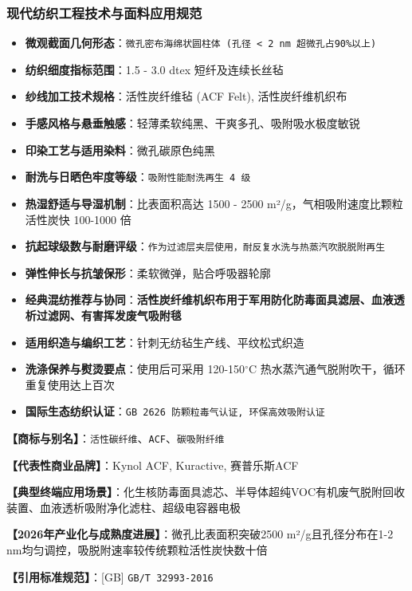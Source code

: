 \documentclass[11pt,openright,twoside,UTF8]{ctexbook}
\begin{document}
\subsubsection*{现代纺织工程技术与面料应用规范}
\begin{itemize} \setlength{\itemsep}{2pt}
    \item \textbf{微观截面几何形态}：\texttt{微孔密布海绵状圆柱体 (孔径 \textless{} 2 nm 超微孔占90\%以上)}
    \item \textbf{纺织细度指标范围}：1.5 - 3.0 dtex 短纤及连续长丝毡
    \item \textbf{纱线加工技术规格}：活性炭纤维毡 (ACF Felt), 活性炭纤维机织布
    \item \textbf{手感风格与悬垂触感}：轻薄柔软纯黑、干爽多孔、吸附吸水极度敏锐
    \item \textbf{印染工艺与适用染料}：微孔碳原色纯黑
    \item \textbf{耐洗与日晒色牢度等级}：\texttt{吸附性能耐洗再生 4 级}
    \item \textbf{热湿舒适与导湿机制}：比表面积高达 1500 - 2500 m²/g，气相吸附速度比颗粒活性炭快 100-1000 倍
    \item \textbf{抗起球级数与耐磨评级}：\texttt{作为过滤层夹层使用，耐反复水洗与热蒸汽吹脱脱附再生}
    \item \textbf{弹性伸长与抗皱保形}：柔软微弹，贴合呼吸器轮廓
    \item \textbf{经典混纺推荐与协同}：\textbf{活性炭纤维机织布用于军用防化防毒面具滤层、血液透析过滤网、有害挥发废气吸附毯}
    \item \textbf{适用织造与编织工艺}：针刺无纺毡生产线、平纹松式织造
    \item \textbf{洗涤保养与熨烫要点}：使用后可采用 120-150$^\circ\mathrm{C}$ 热水蒸汽通气脱附吹干，循环重复使用达上百次
    \item \textbf{国际生态纺织认证}：\texttt{GB 2626 防颗粒毒气认证, 环保高效吸附认证}
\end{itemize}
\vspace{0.2cm}

\noindent\textbf{【商标与别名】}：\texttt{活性碳纤维}、\texttt{ACF}、\texttt{碳吸附纤维}\par
\noindent\textbf{【代表性商业品牌】}：Kynol ACF, Kuractive, 赛普乐斯ACF\par
\noindent\textbf{【典型终端应用场景】}：化生核防毒面具滤芯、半导体超纯VOC有机废气脱附回收装置、血液透析吸附净化滤柱、超级电容器电极\par
\noindent\textbf{【2026年产业化与成熟度进展】}：微孔比表面积突破2500 m²/g且孔径分布在1-2 nm均匀调控，吸脱附速率较传统颗粒活性炭快数十倍\par
\noindent\textbf{【引用标准规范】}：[GB] \texttt{GB/T 32993-2016}\par
\vspace{0.5cm}
\end{document}
